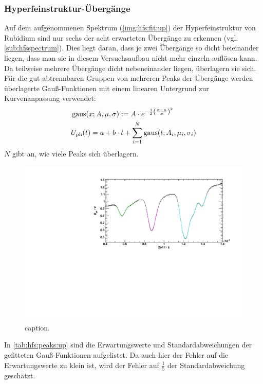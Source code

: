 \subsubsection*{Hyperfeinstruktur-Übergänge}
Auf dem aufgenommenen Spektrum (\autoref{img:hfs:fit:up}) der Hyperfeinstruktur von Rubidium sind nur sechs der acht erwarteten
Übergänge zu erkennen (vgl. \autoref{sub:hfsspectrum}). Dies liegt daran, dass je zwei Übergänge so dicht beieinander liegen,  %
dass man sie in diesem Versuchsaufbau nicht mehr
einzeln auflösen kann. Da teilweise mehrere Übergänge dicht nebeneinander liegen, überlagern sie sich. Für die gut abtrennbaren Gruppen von
mehreren Peaks der Übergänge werden überlagerte Gauß-Funktionen mit einem linearen Untergrund zur Kurvenanpassung verwendet:
\begin{equation}
    \begin{split}
        & \operatorname{gaus}(x; A, \mu, \sigma) := A \cdot e^{-\frac{1}{2} \left( \frac{x-\mu}{\sigma} \right)^2} \\
        & U_\text{ph}(t) = a + b \cdot t + \sum_{i=1}^N \operatorname{gaus}(t; A_i, \mu_i, \sigma_i)
    \end{split}
\end{equation}
$N$ gibt an, wie viele Peaks sich überlagern.
\begin{figure}[H]
\begin{center}
    \includegraphics[width=\textwidth]{../img/part2/up-hfs_zoom_fit.pdf}  %
    \caption{caption.}
    \label{img:hfs:fit:up}
\end{center}
\end{figure}
In \autoref{tab:hfs:peaks:up} sind die Erwartungswerte und Standardabweichungen der gefitteten Gauß-Funktionen aufgelistet. Da auch hier der 
Fehler auf die Erwartungswerte zu klein ist, wird der Fehler auf $\frac{1}{5}$ der Standardabweichung geschätzt.


